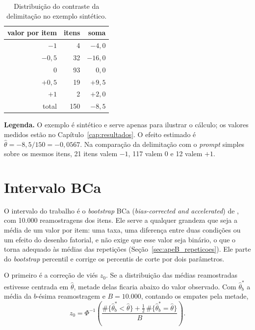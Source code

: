 \begin{table}[H]
\centering
\caption{Distribuição do contraste da delimitação no exemplo sintético.}
\label{tab:apeB_sintetico}
\begin{tabular}{rrr}
\toprule
valor por item & itens & soma \\
\midrule
$-1$ & 4 & $-4{,}0$ \\
$-0{,}5$ & 32 & $-16{,}0$ \\
0 & 93 & $0{,}0$ \\
$+0{,}5$ & 19 & $+9{,}5$ \\
$+1$ & 2 & $+2{,}0$ \\
\midrule
total & 150 & $-8{,}5$ \\
\bottomrule
\end{tabular}
\vspace{2pt}
\begin{minipage}{\textwidth}
\footnotesize\raggedright
\textbf{Legenda.} O exemplo é sintético e serve apenas para ilustrar o
cálculo; os valores medidos estão no Capítulo~\ref{cap:resultados}. O efeito
estimado é $\hat\theta = -8{,}5/150 = -0{,}0567$. Na comparação da
delimitação com o \textit{prompt} simples sobre os mesmos itens, 21 itens
valem $-1$, 117 valem 0 e 12 valem $+1$.
\end{minipage}
\end{table}

\section{Intervalo BCa}\label{sec:apeB_bca}

O intervalo do trabalho é o \textit{bootstrap} BCa
(\textit{bias-corrected and accelerated}) de ,
com 10.000 reamostragens dos itens. Ele serve a qualquer grandeza que seja a
média de um valor por item: uma taxa, uma diferença entre duas condições ou
um efeito do desenho fatorial, e não exige que esse valor seja binário, o que
o torna adequado às médias das repetições (Seção~\ref{sec:apeB_repeticoes}).
Ele parte do \textit{bootstrap} percentil e corrige os percentis de corte por
dois parâmetros.

O primeiro é a correção de viés $z_0$. Se a distribuição das médias
reamostradas estivesse centrada em $\hat\theta$, metade delas ficaria abaixo
do valor observado. Com $\hat\theta^*_b$ a média da $b$-ésima reamostragem e
$B = 10.000$, contando os empates pela metade,
\begin{equation}
z_0 = \Phi^{-1}\!\left(
\frac{\#\{\hat\theta^*_b < \hat\theta\} + \tfrac12\,\#\{\hat\theta^*_b = \hat\theta\}}{B}
\right).
\label{eq:apeB_z0}
\end{equation}

